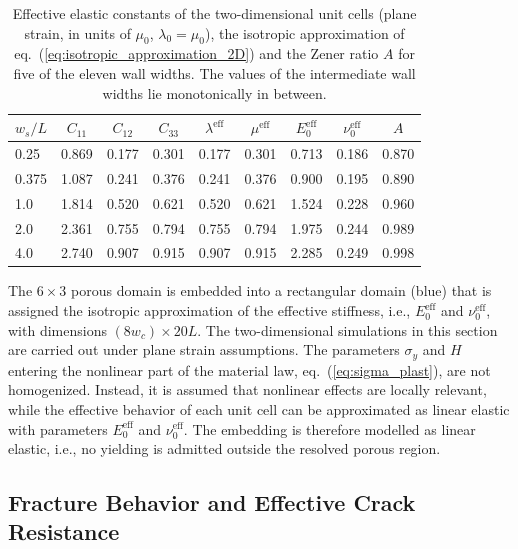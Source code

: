 \documentclass[pdflatex,sn-mathphys-num]{sn-jnl}%
\theoremstyle{thmstyleone}%
\theoremstyle{thmstyletwo}%
\theoremstyle{thmstylethree}%
\begin{document}
\begin{table}[htb]
\centering
\caption{Effective elastic constants of the two-dimensional unit cells (plane strain, in units of $\mu_0$, $\lambda_0 = \mu_0$), the isotropic approximation of eq.~(\ref{eq:isotropic_approximation_2D}) and the Zener ratio $A$ for five of the eleven wall widths. The values of the intermediate wall widths lie monotonically in between.}
\label{tab:effective_stiffness_2D}
\begin{tabular}{lcccccccc}
\toprule
$w_s/L$ & $C_{11}$ & $C_{12}$ & $C_{33}$ & $\lambda^{\text{eff}}$ & $\mu^{\text{eff}}$ & $E_0^{\text{eff}}$ & $\nu_0^{\text{eff}}$ & $A$ \\
\midrule
0.25  & 0.869 & 0.177 & 0.301 & 0.177 & 0.301 & 0.713 & 0.186 & 0.870 \\
0.375 & 1.087 & 0.241 & 0.376 & 0.241 & 0.376 & 0.900 & 0.195 & 0.890 \\
1.0   & 1.814 & 0.520 & 0.621 & 0.520 & 0.621 & 1.524 & 0.228 & 0.960 \\
2.0   & 2.361 & 0.755 & 0.794 & 0.755 & 0.794 & 1.975 & 0.244 & 0.989 \\
4.0   & 2.740 & 0.907 & 0.915 & 0.907 & 0.915 & 2.285 & 0.249 & 0.998 \\
\bottomrule
\end{tabular}
\end{table}

The $6 \times 3$ porous domain is embedded into a rectangular domain (blue) that is assigned the isotropic approximation of the effective stiffness, i.e., $E_0^{\text{eff}}$ and $\nu_0^{\text{eff}}$, with dimensions $(8 w_c) \times 20 L$. The two-dimensional simulations in this section are carried out under plane strain assumptions. The parameters $\sigma_y$ and $H$ entering the nonlinear part of the material law, eq.~(\ref{eq:sigma_plast}), are not homogenized.
Instead, it is assumed that nonlinear effects are locally relevant, while the effective behavior of each unit cell can be approximated as linear elastic with parameters $E_0^{\text{eff}}$ and $\nu_0^{\text{eff}}$. The embedding is therefore modelled as linear elastic, i.e., no yielding is admitted outside the resolved porous region.

\subsection{Fracture Behavior and Effective Crack Resistance}
\label{sec:2D_fracture_behavior}
\end{document}
